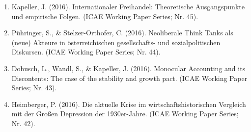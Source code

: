 \begin{enumerate}
	 \item Kapeller, J. (2016). Internationaler Freihandel: Theoretische Ausgangspunkte und empirische Folgen. (ICAE Working Paper Series; Nr. 45).
	 \item Pühringer, S., \& Stelzer-Orthofer, C. (2016). Neoliberale Think Tanks als (neue) Akteure in österreichischen gesellschafts- und sozialpolitischen Diskursen. (ICAE Working Paper Series; Nr. 44).
	 \item Dobusch, L., Wandl, S., \& Kapeller, J. (2016). Monocular Accounting and its Discontents: The case of the stability and growth pact. (ICAE Working Paper Series; Nr. 43).
	 \item Heimberger, P. (2016). Die aktuelle Krise im wirtschaftshistorischen Vergleich mit der Großen Depression der 1930er-Jahre. (ICAE Working Paper Series; Nr. 42).
\end{enumerate}
